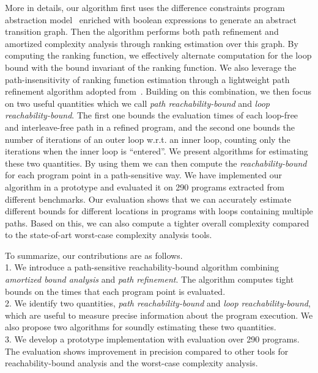 More in details, our algorithm first uses the difference constraints program abstraction model~\cite{SinnZV17,SinnZV14} enriched with boolean expressions to generate an abstract transition graph.
Then the algorithm performs both path refinement and amortized complexity analysis through ranking estimation over this graph.
By computing the ranking function, we effectively alternate computation for the loop bound with the bound invariant of the ranking function. 
We also leverage the path-insensitivity of ranking function estimation through a lightweight path refinement algorithm adopted from~\cite{GulwaniJK09}.
Building on this combination, we then focus on two useful quantities which we call \emph{path reachability-bound} and \emph{loop reachability-bound}.
The first one bounds the evaluation times of each loop-free and interleave-free path in a refined program, and the second one bounds the number of iterations of an outer loop w.r.t. an inner loop, counting only the iterations when the inner loop is ``entered''. 
We present algorithms for estimating these two quantities. By using them we can then 
compute the \emph{reachability-bound} for each program point in a path-sensitive way.
We have implemented our algorithm in a prototype and evaluated it on 290 programs extracted from different benchmarks. Our evaluation %
shows that we can accurately estimate different bounds for different locations in programs with loops containing multiple paths. Based on this, we can also compute a tighter overall complexity compared to the state-of-art worst-case complexity analysis tools.

To summarize, our contributions are as follows.
\\
1. We introduce a path-sensitive reachability-bound algorithm 
combining \emph{amortized bound analysis}  and \emph{path refinement}. The algorithm computes tight bounds on the times that each program point is evaluated.
\\
2. We identify two quantities,  \emph{path reachability-bound} and \emph{loop reachability-bound}, which are useful to measure precise information about the program execution.  We also propose two algorithms for soundly estimating these two quantities.
\\
3. We develop a prototype implementation with evaluation over 290 programs.
 The evaluation shows improvement in precision compared to other tools for reachability-bound analysis and the worst-case complexity analysis.
